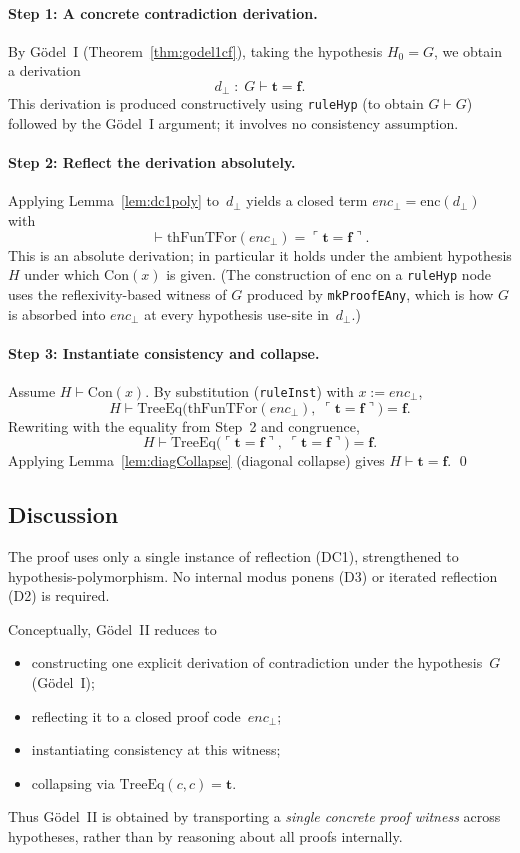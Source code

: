 \documentclass[11pt]{article}
\newcommand{\trueT}{\mathbf{t}}
\newcommand{\falseT}{\mathbf{f}}
\newcommand{\code}[1]{\ulcorner #1 \urcorner}
\newcommand{\thFunTFor}{\mathrm{thFunTFor}}
\newcommand{\TreeEq}{\mathrm{TreeEq}}
\begin{document}
\paragraph{Step 1: A concrete contradiction derivation.}
By G\"odel~I (Theorem~\ref{thm:godel1cf}), taking the hypothesis
$H_0 = G$, we obtain a derivation
\[
  d_\bot \;:\; G \vdash \trueT = \falseT.
\]
This derivation is produced constructively using \texttt{ruleHyp}
(to obtain $G \vdash G$) followed by the G\"odel~I argument;
it involves no consistency assumption.

\paragraph{Step 2: Reflect the derivation absolutely.}
Applying Lemma~\ref{lem:dc1poly} to~$d_\bot$ yields a closed
term $\mathit{enc}_\bot = \mathrm{enc}(d_\bot)$ with
\[
  \vdash \thFunTFor(\mathit{enc}_\bot) = \code{\trueT = \falseT}.
\]
This is an absolute derivation; in particular it holds under the
ambient hypothesis $H$ under which $\mathrm{Con}(x)$ is given.
(The construction of $\mathrm{enc}$ on a \texttt{ruleHyp} node
uses the reflexivity-based witness of $G$ produced by
\texttt{mkProofEAny}, which is how $G$ is absorbed into
$\mathit{enc}_\bot$ at every hypothesis use-site in~$d_\bot$.)

\paragraph{Step 3: Instantiate consistency and collapse.}
Assume $H \vdash \mathrm{Con}(x)$.  By substitution
(\texttt{ruleInst}) with $x := \mathit{enc}_\bot$,
\[
  H \vdash \TreeEq\bigl(\thFunTFor(\mathit{enc}_\bot),\;\code{\trueT = \falseT}\bigr) = \falseT.
\]
Rewriting with the equality from Step~2 and congruence,
\[
  H \vdash \TreeEq\bigl(\code{\trueT = \falseT},\;\code{\trueT = \falseT}\bigr) = \falseT.
\]
Applying Lemma~\ref{lem:diagCollapse} (diagonal collapse) gives
$H \vdash \trueT = \falseT$. \qed

\subsection{Discussion}

The proof uses only a single instance of reflection (DC1),
strengthened to hypothesis-polymorphism.  No internal modus ponens
(D3) or iterated reflection (D2) is required.

Conceptually, G\"odel~II reduces to
\begin{itemize}
\item constructing one explicit derivation of contradiction
  under the hypothesis~$G$ (G\"odel~I);
\item reflecting it to a closed proof code~$\mathit{enc}_\bot$;
\item instantiating consistency at this witness;
\item collapsing via $\TreeEq(c, c) = \trueT$.
\end{itemize}
Thus G\"odel~II is obtained by transporting a \emph{single concrete
proof witness} across hypotheses, rather than by reasoning about
all proofs internally.
\end{document}
